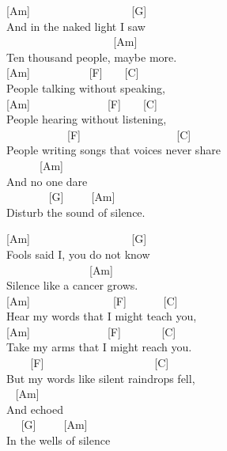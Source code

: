 \documentclass[
  letterpaper,
  twoside=false]{scrbook}
\begin{document}
{[}Am{]} ~ ~ ~ ~ ~ ~ ~ ~ ~ ~ ~{[}G{]}\\
And in the naked light I saw\\
\hspace*{0.333em} ~ ~ ~ ~ ~ ~ ~ ~ ~ ~ ~ ~{[}Am{]}\\
Ten thousand people, maybe more.\\
{[}Am{]} ~ ~ ~ ~ ~ ~ {[}F{]} ~ ~ {[}C{]}\\
People talking without speaking,\\
{[}Am{]} ~ ~ ~ ~ ~ ~ ~ ~ {[}F{]} ~ ~ {[}C{]}\\
People hearing without listening,\\
\hspace*{0.333em} ~ ~ ~ ~ ~ ~ ~{[}F{]} ~ ~ ~ ~ ~ ~ ~ ~ ~ ~ {[}C{]}\\
People writing songs that voices never share\\
\hspace*{0.333em} ~ ~ ~ ~{[}Am{]}\\
And no one dare\\
\hspace*{0.333em} ~ ~ ~ ~ ~{[}G{]} ~ ~ ~{[}Am{]}\\
Disturb the sound of silence.

{[}Am{]} ~ ~ ~ ~ ~ ~ ~ ~ ~ ~ ~{[}G{]}\\
Fools said I, you do not know\\
\hspace*{0.333em} ~ ~ ~ ~ ~ ~ ~ ~ ~ {[}Am{]}\\
Silence like a cancer grows.\\
{[}Am{]} ~ ~ ~ ~ ~ ~ ~ ~ ~{[}F{]} ~ ~ ~ ~{[}C{]}\\
Hear my words that I might teach you,\\
{[}Am{]} ~ ~ ~ ~ ~ ~ ~ ~ {[}F{]} ~ ~ ~ ~ {[}C{]}\\
Take my arms that I might reach you.\\
\hspace*{0.333em} ~ ~ ~{[}F{]} ~ ~ ~ ~ ~ ~ ~ ~ ~ ~ ~ ~{[}C{]}\\
But my words like silent raindrops fell,\\
\hspace*{0.333em} ~ {[}Am{]}\\
And echoed\\
\hspace*{0.333em} ~ ~{[}G{]} ~ ~ ~{[}Am{]}\\
In the wells of silence
\end{document}
